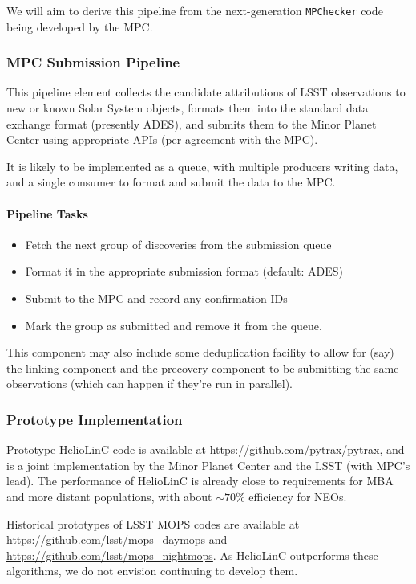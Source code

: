 We will aim to derive this pipeline from the next-generation {\tt MPChecker} code being developed by the MPC.

\subsubsection{MPC Submission Pipeline}

This pipeline element collects the candidate attributions of LSST observations to new or known Solar System objects, formats them into the standard data exchange format (presently ADES), and submits them to the Minor Planet Center using appropriate APIs (per agreement with the MPC).

It is likely to be implemented as a queue, with multiple producers writing data, and a single consumer to format and submit the data to the MPC.

\paragraph{Pipeline Tasks}

\begin{itemize}
	\item Fetch the next group of discoveries from the submission queue
	\item Format it in the appropriate submission format (default: ADES)
	\item Submit to the MPC and record any confirmation IDs
	\item Mark the group as submitted and remove it from the queue.
\end{itemize}

This component may also include some deduplication facility to allow for (say) the linking component and the precovery component to be submitting the same observations (which can happen if they're run in parallel).

\subsubsection{Prototype Implementation}

Prototype HelioLinC code is available at \url{https://github.com/pytrax/pytrax}, and is a joint implementation by the Minor Planet Center and the LSST (with MPC's lead). The performance of HelioLinC is already close to requirements for MBA and more distant populations, with about $\sim70$\% efficiency for NEOs.

Historical prototypes of LSST MOPS codes are available at \url{https://github.com/lsst/mops_daymops} and \url{https://github.com/lsst/mops_nightmops}. As HelioLinC outperforms these algorithms, we do not envision continuing to develop them.
